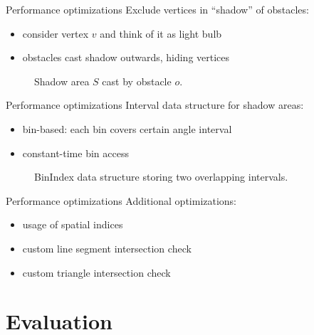 \documentclass[xcolor={x11names}]{beamer}
\renewcommand{\n}{\hfill\\[0.5ex]}
\newenvironment{figcenter}
{%
	\parskip=0pt%
	\par%
	\nopagebreak%
	\centering%
}%
{%
	\par%
	\noindent%
	\ignorespacesafterend%
}
\begin{document}
		\begin{frame}{Performance optimizations}
			Exclude vertices in \enquote{shadow} of obstacles:\n
			\begin{itemize}
				\item consider vertex $v$ and think of it as light bulb
				\item obstacles cast shadow outwards, hiding vertices
			\end{itemize}
			\pause
			\begin{figure}[b]
				\begin{figcenter}
					\scalebox{0.7}
					{
						
					}
				\end{figcenter}
				\caption{Shadow area $S$ cast by obstacle $o$.}
			\end{figure}
		\end{frame}
		
		\begin{frame}{Performance optimizations}
			Interval data structure for shadow areas:\n
			\begin{itemize}
				\item bin-based: each bin covers certain angle interval
				\item constant-time bin access
			\end{itemize}
			\begin{figure}[b]
				\begin{figcenter}
					\scalebox{0.7}
					{
						
					}
				\end{figcenter}
				\caption{BinIndex data structure storing two overlapping intervals.}
			\end{figure}
		\end{frame}
		
		\begin{frame}{Performance optimizations}
			Additional optimizations:
			\begin{itemize}
				\item usage of spatial indices
				\item custom line segment intersection check
				\item custom triangle intersection check
			\end{itemize}
		\end{frame}
	
	\section{Evaluation}
	
\end{document}

